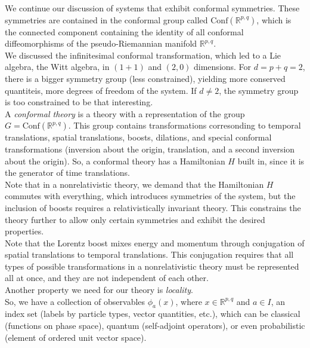 
\noindent We continue our discussion of systems that exhibit conformal symmetries. These symmetries are contained in the conformal group called $\text{Conf}(\mathbb{R}^{p,q})$, which is the connected component containing the identity of all conformal diffeomorphisms of the pseudo-Riemannian manifold $\mathbb{R}^{p,q}$. \\

\noindent We discussed the infinitesimal conformal transformation, which led to a Lie algebra, the Witt algebra, in $(1+1)$ and $(2,0)$ dimensions. For $d = p+q = 2$, there is a bigger symmetry group (less constrained), yielding more conserved quantiteis, more degrees of freedom of the system. If $d \ne 2$, the symmetry group is too constrained to be that interesting. \\

\noindent A \textit{conformal theory} is a theory with a representation of the group $G = \text{Conf}(\mathbb{R}^{p,q})$. This group contains transformations corresonding to temporal translations, spatial translations, boosts, dilations, and special conformal transformations (inversion about the origin, translation, and a second inversion about the origin). So, a conformal theory has a Hamiltonian $H$ built in, since it is the generator of time translations. \\

\noindent Note that in a nonrelativistic theory, we demand that the Hamiltonian $H$ commutes with everything, which introduces symmetries of the system, but the inclusion of boosts requires a relativistically invariant theory. This constrains the theory further to allow only certain symmetries and exhibit the desired properties. \\

\noindent Note that the Lorentz boost mixes energy and momentum through conjugation of spatial translations to temporal translations. This conjugation requires that all types of possible transformations in a nonrelativistic theory must be represented all at once, and they are not independent of each other. \\

\noindent Another property we need for our theory is \textit{locality}. \\

\noindent So, we have a collection of observables $\phi_a (x)$, where $x \in \mathbb{R}^{p,q}$ and $a \in I$, an index set (labels by particle types, vector quantities, etc.), which can be classical (functions on phase space), quantum (self-adjoint operators), or even probabilistic (element of ordered unit vector space). \\

